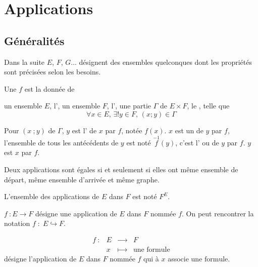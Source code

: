 
\section{Applications}

\subsection{Généralités}
Dans la suite \(𝐸\), \(𝐹\), \(𝐺\)... désignent des ensembles quelconques dont les propriétés sont précisées
selon les besoins.

\begin{definition}
[Application]
Une  \(𝑓\) est la donnée de
\begin{enumerate}
\itemrnd un ensemble \(𝐸\), l',
\itemrnd un ensemble \(𝐹\), l',
\itemrnd une partie \(Γ\) de \(𝐸×𝐹\), le
, telle que
\begin{equation*}
∀𝑥∈𝐸\text{, }∃!𝑦∈𝐹\text{, }(𝑥;𝑦)∈Γ
\end{equation*}
\end{enumerate}
Pour \((𝑥~;𝑦)\) de \(Γ\), \(𝑦\) est l' de \(𝑥\) par
\(𝑓\), notée \(𝑓(𝑥)\). \(𝑥\) est un  de
\(𝑦\) par \(𝑓\), l'ensemble de tous les antécédents de \(𝑦\) est noté
\(\overset{-1}{𝑓}(𝑦)\), c'est l' ou
 de \(𝑦\) par \(𝑓\). \(𝑦\) est
 \(𝑥\) par \(𝑓\).
\end{definition}
%
\begin{remark}
Deux applications sont égales si et seulement si elles ont même
ensemble de départ, même ensemble d'arrivée et même graphe.
\end{remark}
%
\begin{definition}
L'ensemble des applications de \(𝐸\) dans \(𝐹\) est noté \(𝐹^{𝐸}\).

\(𝑓~:𝐸→𝐹\) désigne une application de \(𝐸\) dans \(𝐹\) nommée \(𝑓\).
 On peut rencontrer la notation
\(𝑓\;:\;𝐸↪𝐹\).
\end{definition}
\begin{equation*}
\begin{matrix}
𝑓~:&𝐸&⟶&𝐹\\&𝑥&⟼&\text{une formule}
\end{matrix}
\end{equation*}
désigne l'application de \(𝐸\) dans \(𝐹\) nommée \(𝑓\) qui à \(𝑥\) associe \(\text{une
formule}\).

